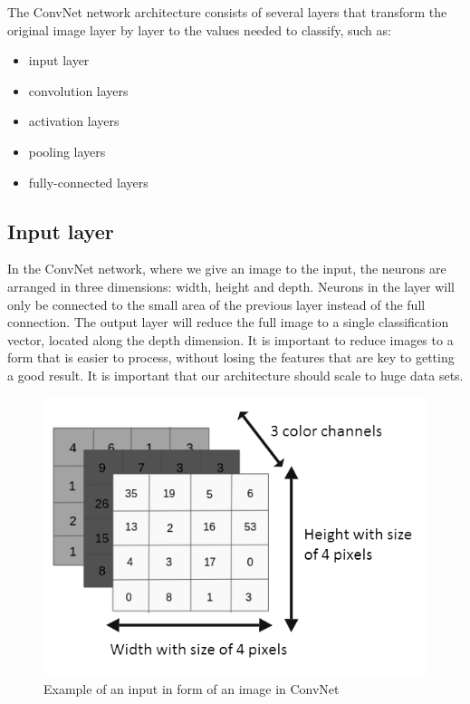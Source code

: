 \documentclass[conference]{IEEEtran}
\begin{document}
The ConvNet network architecture consists of several layers that transform the original image layer by layer to the values needed to classify, such as:
\begin{itemize}
    \item input layer
    \item convolution layers
    \item activation layers
    \item pooling layers
    \item fully-connected layers
\end{itemize}
\subsection{Input layer}
In the ConvNet network, where we give an image to the input, the neurons are arranged in three dimensions: width, height and depth. Neurons in the layer will only be connected to the small area of the previous layer instead of the full connection. The output layer will reduce the full image to a single classification vector, located along the depth dimension. It is important to reduce images to a form that is easier to process, without losing the features that are key to getting a good result. It is important that our architecture should scale to huge data sets.

\begin{figure}[hbt!]
 \centering
    \includegraphics[scale=0.5]{input_layer-b.png}
	    \caption{Example of an input in form of an image in ConvNet}
	    \label{fig:my_label}
\end{figure}
\end{document}
